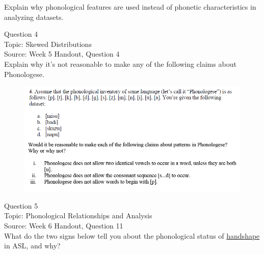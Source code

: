 \documentclass[12pt]{article}
\begin{document}
Explain why phonological features are used instead of phonetic characteristics in analyzing datasets.\\


\newpage

{\large Question 4}\\

Topic: Skewed Distributions\\
Source: Week 5 Handout, Question 4\\

Explain why it's not reasonable to make any of the following claims about Phonologese.\\

\begin{figure}[H]
\includegraphics{../images/Phonologese.png}
\end{figure}

\newpage

{\large Question 5}\\

Topic: Phonological Relationships and Analysis\\
Source: Week 6 Handout, Question 11\\

What do the two signs below tell you about the phonological status of \underline{handshape} in ASL, and why?\\
\end{document}

